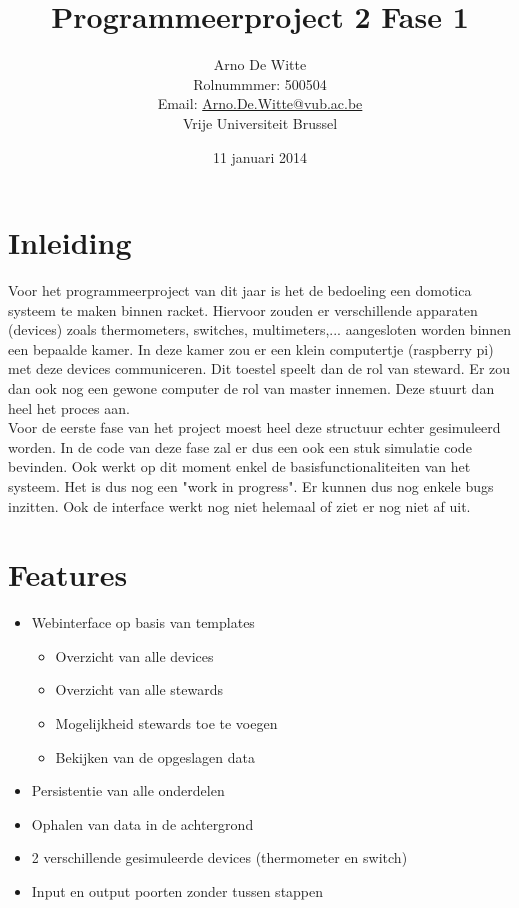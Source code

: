 \documentclass{article}
\title{Programmeerproject 2 Fase 1}
\author{Arno De Witte \\Rolnummmer: 500504\\Email: \href{mailto:Arno.De.Witte@vub.ac.be}{Arno.De.Witte@vub.ac.be}\\
Vrije Universiteit Brussel}
\date{11 januari 2014}
\begin{document}
\maketitle
\newpage
\tableofcontents
\newpage


\section{Inleiding}
Voor het programmeerproject van dit jaar is het de bedoeling een domotica systeem te maken binnen racket. Hiervoor zouden er verschillende apparaten (devices) zoals thermometers, switches, multimeters,... aangesloten worden binnen een bepaalde kamer. In deze kamer zou er een klein computertje (raspberry pi) met deze devices communiceren. Dit toestel speelt dan de rol van steward. Er zou dan ook nog een gewone computer de rol van master innemen. Deze stuurt dan heel het proces aan.\\
Voor de eerste fase van het project moest heel deze structuur echter gesimuleerd worden. In de code van deze fase zal er dus een ook een stuk simulatie code bevinden. Ook werkt op dit moment enkel de basisfunctionaliteiten van het systeem. Het is dus nog een "work in progress". Er kunnen dus nog enkele bugs inzitten. Ook de interface werkt nog niet helemaal of ziet er nog niet af uit.\\

\section{Features}
\begin{itemize}
\item Webinterface op basis van templates
\begin{itemize}
\item Overzicht van alle devices
\item Overzicht van alle stewards
\item Mogelijkheid stewards toe te voegen
\item Bekijken van de opgeslagen data
\end{itemize}
\item Persistentie van alle onderdelen
\item Ophalen van data in de achtergrond
\item 2 verschillende gesimuleerde devices (thermometer en switch)
\item Input en output poorten zonder tussen stappen
\end{itemize}
\end{document}
